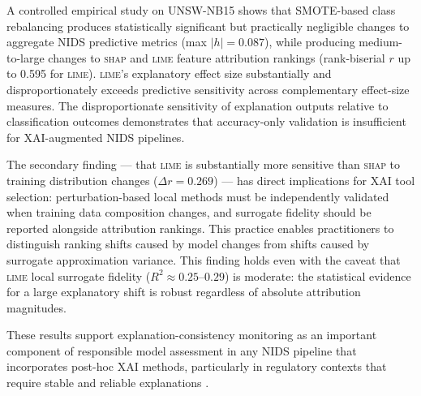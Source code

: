 \documentclass[conference,a4paper]{IEEEtran}
\newcommand{\SHAP}{\textsc{shap}\xspace}
\newcommand{\LIME}{\textsc{lime}\xspace}
\newcommand{\NIDS}{NIDS\xspace}
\newcommand{\SMOTE}{SMOTE\xspace}
\newcommand{\XAI}{XAI\xspace}
\begin{document}
A controlled empirical study on UNSW-NB15 shows that \SMOTE-based class
rebalancing produces statistically significant but practically negligible changes
to aggregate \NIDS predictive metrics (max $|h|=0.087$), while producing
medium-to-large changes to \SHAP and \LIME feature attribution rankings
(rank-biserial $r$ up to 0.595 for \LIME). \LIME's explanatory effect size
substantially and disproportionately exceeds predictive sensitivity across
complementary effect-size measures. The disproportionate sensitivity of
explanation outputs relative to classification outcomes demonstrates that
accuracy-only validation is insufficient for \XAI-augmented \NIDS pipelines.

The secondary finding --- that \LIME is substantially more sensitive than \SHAP
to training distribution changes ($\Delta r=0.269$) --- has direct implications
for \XAI tool selection: perturbation-based local methods must be independently
validated when training data composition changes, and surrogate fidelity should
be reported alongside attribution rankings. This practice enables practitioners to
distinguish ranking shifts caused by model changes from shifts caused by surrogate
approximation variance. This finding holds even with the caveat that \LIME local
surrogate fidelity ($R^2 \approx 0.25$--$0.29$) is moderate: the statistical
evidence for a large explanatory shift is robust regardless of absolute attribution
magnitudes.

These results support explanation-consistency monitoring as an important component
of responsible model assessment in any \NIDS pipeline that incorporates post-hoc
\XAI methods, particularly in regulatory contexts that require stable and reliable
explanations \cite{euaiact2024}.
\end{document}
